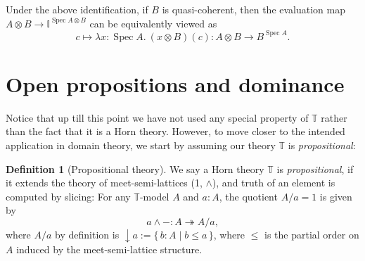 \documentclass[12pt]{amsart}
\newtheorem{proposition}[theorem]{Proposition}
\theoremstyle{definition}
\newtheorem{definition}[theorem]{Definition}
\newtheorem{remark}[theorem]{Remark}
\newcommand{\mb}[1]{\mathbf{#1}}
\newcommand{\mbb}[1]{\mathbb{#1}}
\newcommand{\T}{\mbb T}
\newcommand{\I}{\mbb I}
\newcommand{\alg}{\text{-}\mb{Alg}}
\newcommand{\scomp}[2]{\{\,#1\mid#2\,\}}
\newcommand{\surj}{\twoheadrightarrow}
\newcommand{\cv}{\operatorname{\downarrow}}
\newcommand{\ld}[2]{\lambda #1\!\colon\!\!#2.\ }
\newcommand{\spec}{\operatorname{Spec}}
\begin{document}
Under the above identification, if $B$ is quasi-coherent, then the evaluation map $A \otimes B \to \I^{\spec A \otimes B}$ can be equivalently viewed as
\[ c \mapsto \ld{x}{\spec A} (x\otimes B)(c) : A \otimes B \to B^{\spec A}. \]






\section{Open propositions and dominance}\label{sec:dominance}

Notice that up till this point we have not used any special property of $\T$ rather than the fact that it is a Horn theory. However, to move closer to the intended application in domain theory, we start by assuming our theory $\T$ is \emph{propositional}: 

\begin{definition}[Propositional theory]\label{defn:propositional}
  We say a Horn theory $\T$ is \emph{propositional}, if it extends the theory of meet-semi-lattices (1, $\wedge$), and truth of an element is computed by slicing: For any $\T$-model $A$ and $a:A$, the quotient $A/a=1$ is given by
  \[ a \wedge - : A \surj A/a, \]
  where $A/a$ by definition is $\cv a := \scomp{b:A}{b\le a}$, where $\le$ is the partial order on $A$ induced by the meet-semi-lattice structure.
\end{definition}
\end{document}
